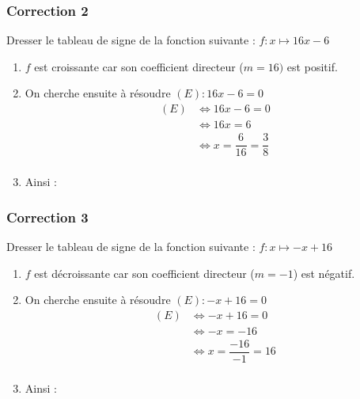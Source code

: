 \documentclass[15pt, mathserif]{beamer}
\begin{document}
\begin{frame}
\vspace{-10mm}
	\frametitle{Correction 2}
\vspace*{1cm} 
 \footnotesize{Dresser le tableau de signe de la fonction suivante : $ f:x\mapsto16x-6$} 
 \begin{enumerate} 
 \item $f$ est croissante car son coefficient directeur ($m=16)$ est positif.
 \item On cherche ensuite à résoudre  $(E) : 16x-6=0 $	 
 \begin{align*} (E)& \Leftrightarrow 16x-6=0\\
		 	 & \Leftrightarrow 16x=6\\
			 & \Leftrightarrow x= \dfrac{6}{16}=\dfrac{3}{8}\\
	 \end{align*} 
 \item Ainsi : \\ 
 \end{enumerate} 
 \end{frame}


\begin{frame}
\vspace{-10mm}
	\frametitle{Correction 3}
\vspace*{1cm} 
 \footnotesize{Dresser le tableau de signe de la fonction suivante : $ f:x\mapsto-x+16$} 
 \begin{enumerate} 
 \item $f$ est décroissante car son coefficient directeur ($m=-1$) est négatif.
 \item On cherche ensuite à résoudre  $(E) : -x+16=0 $	 
 \begin{align*} (E)& \Leftrightarrow -x+16=0\\
		 	 & \Leftrightarrow -x=-16\\
			 & \Leftrightarrow x= \dfrac{-16}{-1}=16\\
	 \end{align*} 
 \item Ainsi : \\ 
 \end{enumerate} 
 \end{frame}
\end{document}
